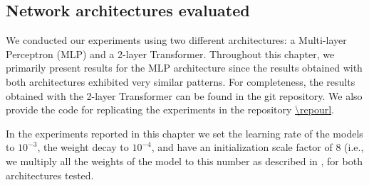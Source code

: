 ﻿\documentclass[../ppgc-tese.tex]{subfiles}
\begin{document}
\subsection{Network architectures evaluated}\label{sec:archtectures}


We conducted our experiments using two different architectures: a Multi-layer Perceptron (MLP) and a 2-layer Transformer.
Throughout this chapter, we primarily present results for the MLP architecture since the results obtained with both architectures exhibited very similar patterns.
For completeness, the results obtained with the 2-layer Transformer can be found in the git repository. %
We also provide the code for replicating the experiments in the repository \url{\repourl}.

%
In the experiments reported in this chapter we set the learning rate of the models to $10^{-3}$, the weight decay to $10^{-4}$, and have an initialization scale factor of 8 (i.e., we multiply all the weights of the model to this number as described in \cite{liu2022Grokking}, for both architectures tested.
\end{document}
